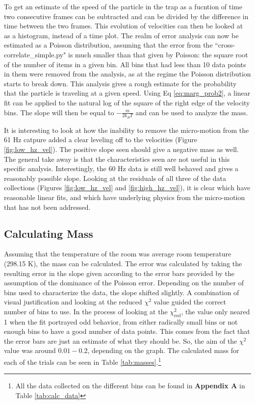 \documentclass[12pt]{article}
\begin{document}
To get an estimate of the speed of the particle in the trap as a fucntion of time two consecutive frames can be subtracted and can be divided by the difference in time between the two frames. This evolution of velocities can then be looked at as a histogram, instead of a time plot. The realm of error analysis can now be estimated as a Poisson distribution, assuming that the error from the ``cross-correlate\_simple.py" is much smaller than that given by Poisson: the square root of the number of items in a given bin. All bins that had less than 10 data points in them were removed from the analysis, as at the regime the Poisson distribution starts to break down. This analysis gives a rough estimate for the probability that the particle is traveling at a given speed. Using Eq \ref{eq:marg_prob2}, a linear fit can be applied to the natural log of the square of the right edge of the velocity bins. The slope will then be equal to $-\frac{m}{2 k_B T}$ and can be used to analyze the mass. 

It is interesting to look at how the inability to remove the micro-motion from the 61 Hz catpure added a clear leveling off to the velocities (Figure \ref{fig:low_hz_vel}). The positive slope seen should give a negative mass as well. The general take away is that the characteristics seen are not useful in this specific analysis. Interestingly, the 60 Hz data is still well behaved and gives a reasonably possible slope. Looking at the residuals of all three of the data collections (Figures  \ref{fig:low_hz_vel} and \ref{fig:high_hz_vel}), it is clear which have reasonable linear fits, and which have underlying physics from the micro-motion that has not been addressed. 


\subsection{Calculating Mass}

Assuming that the temperature of the room was average room temperature (298.15 K), the mass can be calculated. The error was calculated by taking the resulting error in the slope given according to the error bars provided by the assumption of the dominance of the Poisson error. Depending on the number of bins used to characterize the data, the slope shifted slightly. A combination of visual justification and looking at the reduced $\chi^2$ value guided the correct number of bins to use. In the process of looking at the $\chi_\text{red}^2$, the value only neared 1 when the fit portrayed odd behavior, from either radically small bins or not enough bins to have a good number of data points. This comes from the fact that the error bars are just an estimate of what they should be. So, the aim of the $\chi^2$ value was around $0.01-0.2$, depending on the graph. The calculated mass for each of the trials can be seen in Table \ref{tab:masses}.\footnote{All the data collected on the different bins can be found in \textbf{Appendix A} in Table \ref{tab:calc_data}}
\end{document}
